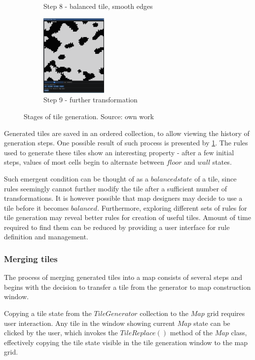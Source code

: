 \documentclass[12pt]{report}
\begin{document}
\begin{figure}[ht!]
\begin{subfigure}[t]{0.3\textwidth}
		\caption{Step 8 - balanced tile, smooth edges} 
	\end{subfigure} \hspace{1em} 
	\begin{subfigure}[t]{0.3\textwidth}
		\centering
		\includegraphics[height=4cm]{images/s_9}
		\caption{Step 9 - further transformation} 
	\end{subfigure} \hspace{1em} 
	\label{fig:tilegen}
	\caption{Stages of tile generation. Source: own work} 
\end{figure}

Generated tiles are saved in an ordered collection, to allow viewing the history of generation steps. One possible result of such process is presented by \cref{fig:tilegen}. The rules used to generate these tiles show an interesting property - after a few initial steps, values of most cells begin to alternate between $floor$ and $wall$ states.

Such emergent condition can be thought of as a $balanced state$ of a tile, since rules seemingly cannot further modify the tile after a sufficient number of transformations. It is however possible that map designers may decide to use a tile before it becomes $balanced$. Furthermore, exploring different sets of rules for tile generation may reveal better rules for creation of useful tiles. Amount of time required to find them can be reduced by providing a user interface for rule definition and management.

\subsubsection{Merging tiles}
 
The process of merging generated tiles into a map consists of several steps and begins with the decision to transfer a tile from the generator to map construction window.

Copying a tile state from the $TileGenerator$ collection to the $Map$ grid requires user interaction. Any tile in the window showing current $Map$ state can be clicked by the user, which invokes the $TileReplace()$ method of the $Map$ class, effectively copying the tile state visible in the tile generation window to the map grid. 
\end{document}
